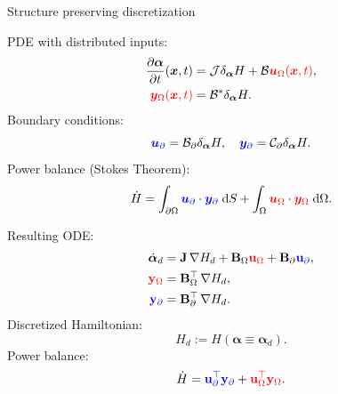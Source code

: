 \documentclass[aspectratio=169]{ISAE-Beamer}
\begin{document}
\begin{frame}{Structure preserving discretization}
\begin{tcbraster}[raster columns=2, raster equal height]
	\begin{tcolorbox}[width=0.4\textwidth, nobeforeafter, colframe=theme,title=Infinite-dimensional pH system]%
		PDE with distributed inputs:
		\begin{align*}
		\diffp{\bm{\alpha}}{t}(\bm{x}, t) &= \mathcal{J} \delta_{\bm{\alpha}} H + \mathcal{B} \textcolor{red}{\bm{u}_\Omega(\bm{x}, t)}, \\
		\textcolor{red}{\bm{y}_\Omega(\bm{x}, t)} &= \mathcal{B}^* \delta_{\bm{\alpha}} H.
		\end{align*}
		Boundary conditions: 
		\[\textcolor{blue}{\bm{u}_\partial} = \mathcal{B}_\partial \delta_{\bm{\alpha}} H, \quad \textcolor{blue}{\bm{y}_\partial} = \mathcal{C}_\partial \delta_{\bm{\alpha}} H. \]
		Power balance (Stokes Theorem): 
		\[ \dot{H} = \displaystyle \int_{\partial \Omega} \textcolor{blue}{\bm{u}_\partial} \cdot \textcolor{blue}{\bm{y}_\partial} \d{S} +  \int_{\Omega} \textcolor{red}{\bm{u}_\Omega} \cdot \textcolor{red}{\bm{y}_\Omega} \d{\Omega}.
		\]
	\end{tcolorbox} 
	\begin{tcolorbox}[width=0.4\textwidth, nobeforeafter,  colframe=theme,title=Structure-preserving discretization]%
		Resulting ODE:
		\begin{align*}
		\dot{\bm{\alpha}}_d &= \mathbf{J} \, {\nabla {H}_d} + \mathbf{B}_\Omega \textcolor{red}{\mathbf{u}_\Omega} + \mathbf{B}_\partial \textcolor{blue}{\mathbf{u}_\partial}, \\
		\textcolor{red}{\mathbf{y}_\Omega} &= \mathbf{B}_\Omega^\top \, {\nabla {H}_d}, \\
		\textcolor{blue}{\mathbf{y}_\partial} &= \mathbf{B}_\partial^\top \,{\nabla {H}_d}.
		\end{align*}
		Discretized Hamiltonian:
		\[
		H_d := H(\bm{\alpha} \equiv \bm{\alpha}_d).
		\]
		Power balance: 
		\[ \dot{H} = \textcolor{blue}{\mathbf{u}_\partial^\top \mathbf{y}_\partial} +  \textcolor{red}{\mathbf{u}_\Omega^\top \mathbf{y}_\Omega}.
		\]
	\end{tcolorbox}
\end{tcbraster}
\end{frame}
\end{document}
